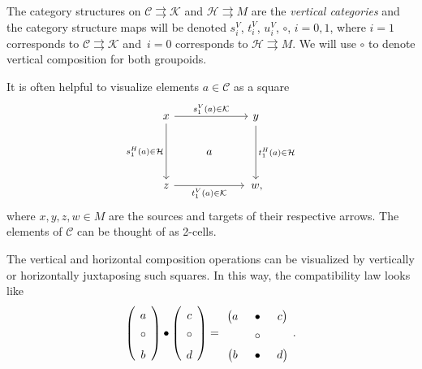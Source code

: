 \documentclass[10pt,a4paper]{amsart}
\numberwithin{equation}{section}
\theoremstyle{definition}
\newcommand{\CC}{\mathcal{C}}
\newcommand{\CH}{\mathcal{H}}
\newcommand{\CK}{\mathcal{K}}
\newcommand{\grpd}{\rightrightarrows}
\begin{document}
The category structures on $ \CC \grpd \CK $ and $ \CH \grpd M $ are the \emph{vertical categories} and the category structure maps will be denoted
$s^V_{i}$, $t^V_{i}$, $u^V_i$, $\circ$, $i = 0,1$,
where $ i = 1$ corresponds to $ \CC \grpd \CK $ and~${i= 0}$ corresponds to $ \CH \grpd M$. We will use $ \circ $ to denote vertical composition for both groupoids.

It is often helpful to visualize elements $a \in \CC $ as a square
\[
\begin{tikzcd}
   x \arrow[rr, "s_1^V(a) \in \CK"] \arrow[dd, "s_1^H(a) \in \CH", swap] & & y \arrow[dd, "t_1^H(a) \in \CH"] \\
   & a & \\
   z\arrow[rr, "t_1^V(a) \in \CK", swap] & &\, w,
\end{tikzcd}
\]
where $ x,y,z,w \in M $ are the sources and targets of their respective arrows. The elements of $ \CC $ can be thought of as 2-cells.

The vertical and horizontal composition operations can be visualized by vertically or horizontally juxtaposing such squares. In this way, the compatibility law looks like
\[
\left( \begin{tikzcd}[column sep = tiny, row sep = tiny]
a \\
\circ \\
b
\end{tikzcd} \right)
\bullet
\left(
\begin{tikzcd}[column sep = tiny, row sep = tiny]
c \\
\circ \\
d
\end{tikzcd}\right)
=
\begin{tikzcd} [column sep = tiny, row sep = 0.15em]
\big( a &\bullet & c \big) \\
& \circ  & \\
\big( b & \bullet & d \big)
\end{tikzcd}.
\]
\end{document}

